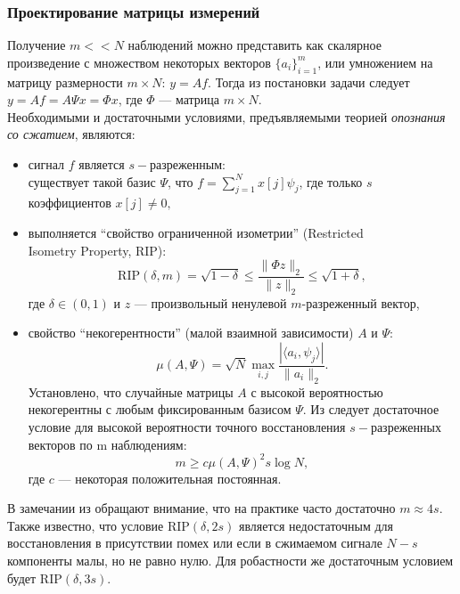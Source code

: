 \documentclass[14pt]{matmex-diploma-custom}
\begin{document}
\subsubsection*{Проектирование матрицы измерений}

Получение $m << N$ наблюдений можно представить как скалярное произведение с множеством некоторых векторов $\{a_i\}_{i=1}^m$, или умножением на матрицу размерности $m\times N$: $y= A f$. Тогда из постановки задачи следует $y=A f = A \Psi x = \Phi x$, где $\Phi$ --- матрица $m \times N$. \\

Необходимыми и достаточными условиями, предъявляемыми теорией \textit{опознания со сжатием}, являются:
\begin{itemize}
\item сигнал $f$ является $s-$разреженным: \\существует такой базис $\Psi$, что $f = \sum_{j=1}^N x[j] \psi_j$, где только $s$ коэффициентов $x[j]\neq 0,$
\item выполняется ``свойство ограниченной изометрии'' (Restricted \\Isometry Property, RIP):
$$\text{RIP}(\delta, m)= \sqrt{1 - \delta} \leq \frac{\| \Phi z \|_2}{\| z\|_2} \leq \sqrt{1 + \delta},$$ 
где $\delta \in (0,1)$ и $z$ --- произвольный ненулевой $m$-разреженный вектор,

\item свойство ``некогерентности'' (малой взаимной зависимости) $A$ и $\Psi$:
$$\mu (A, \Psi) = \sqrt{N} \max_{i,j}\frac{|\langle a_i, \psi_j\rangle |}{\| a_i\|_2}.$$
Установлено, что случайные матрицы $A$ с высокой вероятностью некогерентны с любым фиксированным базисом $\Psi$.
Из \cite{candes2007sparsity} следует достаточное условие для высокой вероятности точного восстановления $s-$разреженных векторов по m наблюдениям:
\begin{equation}m \geq c \mu (A,\Psi)^2 s \log{N}, \end{equation}
где $c$ --- некоторая положительная постоянная.
\end{itemize}

В замечании из \cite{cande2008introduction} обращают внимание, что на практике часто достаточно $m\approx 4s$. Также известно, что условие $\text{RIP}(\delta, 2s)$ является недостаточным для восстановления в присутствии помех или если в сжимаемом сигнале $N - s$ компоненты малы, но не равно нулю. Для робастности же достаточным условием будет $\text{RIP}(\delta, 3s)$.
\end{document}
